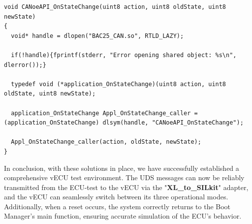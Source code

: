 \begin{lstlisting}[caption={Calling CANoeAPI\_OnStateChange from BAC25\_CAN.so.}, label={lst:StateChange}]
void CANoeAPI_OnStateChange(uint8 action, uint8 oldState, uint8 newState)
{
  void* handle = dlopen("BAC25_CAN.so", RTLD_LAZY);

  if(!handle){fprintf(stderr, "Error opening shared object: %s\n", dlerror());}

  typedef void (*application_OnStateChange)(uint8 action, uint8 oldState, uint8 newState);

  application_OnStateChange Appl_OnStateChange_caller = (application_OnStateChange) dlsym(handle, "CANoeAPI_OnStateChange");

  Appl_OnStateChange_caller(action, oldState, newState);
}
\end{lstlisting}

In conclusion, with these solutions in place, we have successfully established a comprehensive vECU test environment. The UDS messages can now be reliably transmitted from the ECU-test to the vECU via the "\textbf{XL\_to\_SILkit}" adapter, and the vECU can seamlessly switch between its three operational modes. Additionally, when a reset occurs, the system correctly returns to the Boot Manager's main function, ensuring accurate simulation of the ECU's behavior. 